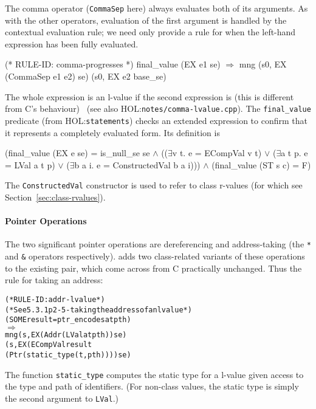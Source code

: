 \documentclass[11pt]{article}
\newcommand{\HOLfile}[1]{HOL:\texttt{#1}}
\begin{document}
\medskip
\noindent
{}%
The comma operator (\texttt{CommaSep} here) always evaluates both of
its arguments.  As with the other operators, evaluation of the first
argument is handled by the contextual evaluation rule; we need only
provide a rule for when the left-hand expression has been fully
evaluated.
\begin{stdrule}
(* RULE-ID: comma-progresses *)
     final_value (EX e1 se)
   \(\Rightarrow\)
     mng (s0, EX (CommaSep e1 e2) se)
         (s0, EX e2 base_se)
\end{stdrule}
%
The whole expression is an l-value if the second expression is (this
is different from C's behaviour)~\cite[\S5.18]{cpp-standard-iso14882}
(see also \HOLfile{notes/comma-lvalue.cpp}).
%
The \texttt{final_value} predicate (from \HOLfile{statements}) checks
an extended expression to confirm that it represents a completely
evaluated form.  Its definition is
\vspace{1ex}
\begin{stdrule}
   (final_value (EX e se) =
      is_null_se se \(\land\)
      ((\(\exists\)v t. e = ECompVal v t) \(\lor\)
       (\(\exists\)a t p. e = LVal a t p) \(\lor\)
       (\(\exists\)b a i. e = ConstructedVal b a i))) \(\land\)
   (final_value (ST s c) = F)
\end{stdrule}
The \texttt{ConstructedVal} constructor%
is used to refer to class r-values (for which see
Section~\ref{sec:class-rvalues}).

\paragraph{Pointer Operations}
The two significant pointer operations are dereferencing and
address-taking (the \texttt{*} and \texttt{\&} operators
respectively).  \cpp{} adds two class-related variants of these
operations to the existing pair, which come across from C practically
unchanged.  Thus the rule for taking an address:
%
\begin{alltt}
(* RULE-ID: addr-lvalue *)
(* See 5.3.1 p2-5 - taking the address of an lvalue *)
     (SOME result = ptr_encode s a t pth)
   \(\Rightarrow\)
     mng (s, EX (Addr (LVal a t pth)) se)
         (s, EX (ECompVal result
                          (Ptr (static_type (t,pth)))) se)

\end{alltt}
%
The function
\texttt{static_type} computes
the static type for a l-value given access to the type and path of
identifiers.  (For non-class values, the static type is simply the
second argument to \texttt{LVal}.)
\end{document}
